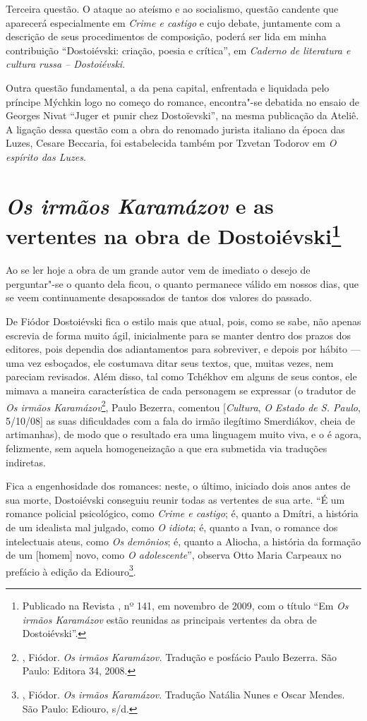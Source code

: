Terceira questão. O ataque ao ateísmo e ao socialismo, questão candente que aparecerá
especialmente em \emph{Crime e castigo} e cujo debate, juntamente com a descrição de seus
procedimentos de composição, poderá ser lida em minha contribuição 
``Dostoiévski: criação, poesia e crítica'', em \emph{Caderno
de literatura e cultura russa -- Dostoiévski}.

Outra questão fundamental, a da pena capital, enfrentada e liquidada
pelo príncipe Mýchkin logo no começo do romance, encontra"-se debatida no
ensaio de Georges Nivat ``Juger et punir chez Dostoïevski'', na mesma
publicação da Ateliê. A ligação dessa questão com a obra do renomado
jurista italiano da época das Luzes, Cesare Beccaria, foi estabelecida
também por Tzvetan Todorov em \emph{O espírito das Luzes}.

\chapter{\emph{Os irmãos Karamázov} e as vertentes na obra de
Dostoiévski\footnote{Publicado na Revista , nº 141, em novembro de 2009,
  com o título ``Em \emph{Os irmãos Karamázov} estão reunidas as
  principais vertentes da obra de Dostoiévski''.}}

Ao se ler hoje a obra de um grande autor vem de imediato o desejo de
perguntar"-se o quanto dela ficou, o quanto permanece válido em nossos
dias, que se veem continuamente desapossados de tantos dos valores do
passado.

De Fiódor Dostoiévski fica o estilo mais que atual, pois, como se sabe,
não apenas escrevia de forma muito ágil, inicialmente para se manter
dentro dos prazos dos editores, pois dependia dos adiantamentos para
sobreviver, e depois por hábito --- uma vez esboçados, ele costumava
ditar seus textos, que, muitas vezes, nem pareciam revisados. Além
disso, tal como Tchékhov em alguns de seus contos, ele mimava a maneira
característica de cada personagem se expressar (o tradutor de \emph{Os
irmãos Karamázov}\footnote{, Fiódor. \emph{Os irmãos
  Karamázov.} Tradução e posfácio Paulo Bezerra. São Paulo: Editora 34,
  2008.}, Paulo Bezerra, comentou [\emph{Cultura}, \emph{O Estado de S.
Paulo}, 5/10/08] as suas dificuldades com a fala do irmão ilegítimo
Smerdiákov, cheia de artimanhas), de modo que o resultado era uma
linguagem muito viva, e o é agora, felizmente, sem aquela homogeneização
a que era submetida via traduções indiretas.

Fica a engenhosidade dos romances: neste, o último, iniciado dois anos
antes de sua morte, Dostoiévski conseguiu reunir todas as vertentes de
sua arte. ``É um romance policial psicológico, como \emph{Crime e
castigo}; é, quanto a Dmítri, a história de um idealista mal julgado,
como \emph{O idiota}; é, quanto a Ivan, o romance dos intelectuais
ateus, como \emph{Os demônios}; é, quanto a Aliocha, a história da
formação de um [homem] novo, como \emph{O adolescente}'', observa
Otto Maria Carpeaux no prefácio à edição da Ediouro\footnote{,
  Fiódor. \emph{Os irmãos Karamázov}. Tradução Natália Nunes e Oscar
  Mendes. São Paulo: Ediouro, s/d.}.

